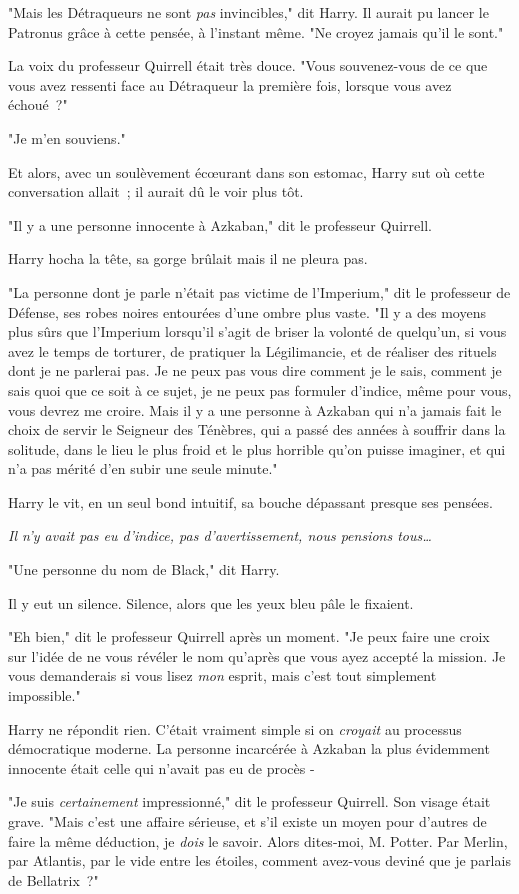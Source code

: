 "Mais les Détraqueurs ne sont \emph{pas} invincibles," dit Harry. Il aurait pu lancer le Patronus grâce à cette pensée, à l'instant même. "Ne croyez jamais qu'il le sont."

La voix du professeur Quirrell était très douce. "Vous souvenez-vous de ce que vous avez ressenti face au Détraqueur la première fois, lorsque vous avez échoué~?"

"Je m'en souviens."

Et alors, avec un soulèvement écœurant dans son estomac, Harry sut où cette conversation allait~; il aurait dû le voir plus tôt.

"Il y a une personne innocente à Azkaban," dit le professeur Quirrell.

Harry hocha la tête, sa gorge brûlait mais il ne pleura pas.

"La personne dont je parle n'était pas victime de l'Imperium," dit le professeur de Défense, ses robes noires entourées d'une ombre plus vaste. "Il y a des moyens plus sûrs que l'Imperium lorsqu'il s'agit de briser la volonté de quelqu'un, si vous avez le temps de torturer, de pratiquer la Légilimancie, et de réaliser des rituels dont je ne parlerai pas. Je ne peux pas vous dire comment je le sais, comment je sais quoi que ce soit à ce sujet, je ne peux pas formuler d'indice, même pour vous, vous devrez me croire. Mais il y a une personne à Azkaban qui n'a jamais fait le choix de servir le Seigneur des Ténèbres, qui a passé des années à souffrir dans la solitude, dans le lieu le plus froid et le plus horrible qu'on puisse imaginer, et qui n'a pas mérité d'en subir une seule minute."

Harry le vit, en un seul bond intuitif, sa bouche dépassant presque ses pensées.

\emph{Il n'y avait pas eu d'indice, pas d'avertissement, nous pensions tous…}

"Une personne du nom de Black," dit Harry.

Il y eut un silence. Silence, alors que les yeux bleu pâle le fixaient.

"Eh bien," dit le professeur Quirrell après un moment. "Je peux faire une croix sur l'idée de ne vous révéler le nom qu'après que vous ayez accepté la mission. Je vous demanderais si vous lisez \emph{mon} esprit, mais c'est tout simplement impossible."

Harry ne répondit rien. C'était vraiment simple si on \emph{croyait} au processus démocratique moderne. La personne incarcérée à Azkaban la plus évidemment innocente était celle qui n'avait pas eu de procès -

"Je suis \emph{certainement} impressionné," dit le professeur Quirrell. Son visage était grave. "Mais c'est une affaire sérieuse, et s'il existe un moyen pour d'autres de faire la même déduction, je \emph{dois} le savoir. Alors dites-moi, M. Potter. Par Merlin, par Atlantis, par le vide entre les étoiles, comment avez-vous deviné que je parlais de Bellatrix~?" 


